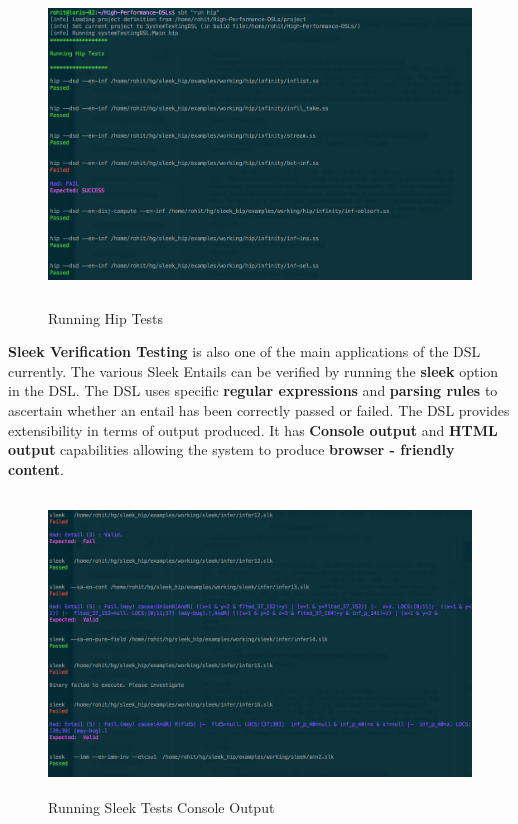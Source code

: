 \begin{figure}[H]
  \centering
    \includegraphics[height=320px]{figures/hip_testing.png}
  \caption{Running Hip Tests}
\end{figure}

\noindent
\textbf{Sleek Verification Testing} is also one of the main applications of the DSL currently. The various Sleek Entails can be verified by running the \textbf{sleek} option in the DSL. The DSL uses specific \textbf{regular expressions} and \textbf{parsing rules} to ascertain whether an entail has been correctly passed or failed. The DSL provides extensibility in terms of output produced. It has \textbf{Console output} and \textbf{HTML output} capabilities allowing the system to produce \textbf{browser - friendly content}.
\bigskip

\begin{figure}[H]
  \centering
    \includegraphics[height=300px]{figures/sleek_testing.png}
  \caption{Running Sleek Tests Console Output}
\end{figure}

